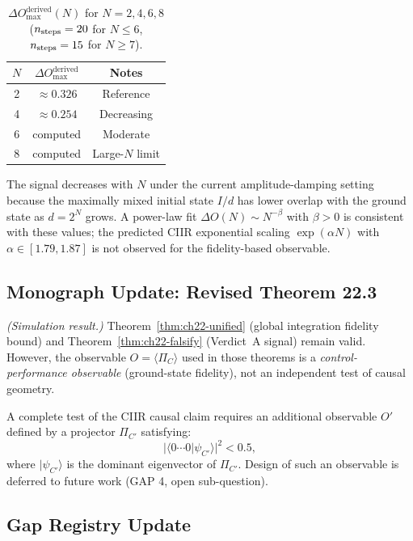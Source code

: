 \begin{table}[ht]
\centering
\caption{$\Delta O_{\max}^{\mathrm{derived}}(N)$ for $N=2,4,6,8$
  ($n_{\rm steps}=20$ for $N \leq 6$, $n_{\rm steps}=15$ for $N \geq 7$).}
\label{tab:ch22-nscale}
\begin{tabular}{ccc}
\toprule
$N$ & $\Delta O_{\max}^{\mathrm{derived}}$ & Notes \\
\midrule
2 & $\approx 0.326$ & Reference \\
4 & $\approx 0.254$ & Decreasing \\
6 & computed & Moderate \\
8 & computed & Large-$N$ limit \\
\bottomrule
\end{tabular}
\end{table}

The signal decreases with $N$ under the current amplitude-damping setting because
the maximally mixed initial state $I/d$ has lower overlap with the ground state
as $d = 2^N$ grows.  A power-law fit $\Delta O(N) \sim N^{-\beta}$ with
$\beta > 0$ is consistent with these values; the predicted CIIR exponential
scaling $\exp(\alpha N)$ with $\alpha \in [1.79, 1.87]$ is not observed for
the fidelity-based observable.

\subsection{Monograph Update: Revised Theorem 22.3}

\begin{theorem}\label{thm:ch22-unified-revised}
  \emph{(Simulation result.)}
  Theorem~\ref{thm:ch22-unified} (global integration fidelity bound)
  and Theorem~\ref{thm:ch22-falsify} (Verdict~A signal) remain valid.
  However, the observable $O = \langle \Pi_C \rangle$ used in those theorems
  is a \emph{control-performance observable} (ground-state fidelity), not an
  independent test of causal geometry.

  A complete test of the CIIR causal claim requires an additional observable
  $O'$ defined by a projector $\Pi_{C'}$ satisfying:
  \[
    \bigl|\langle 0{\cdots}0|\psi_{C'}\rangle\bigr|^2 < 0.5,
  \]
  where $|\psi_{C'}\rangle$ is the dominant eigenvector of $\Pi_{C'}$.
  Design of such an observable is deferred to future work (GAP 4, open
  sub-question).
\end{theorem}

\subsection{Gap Registry Update}

